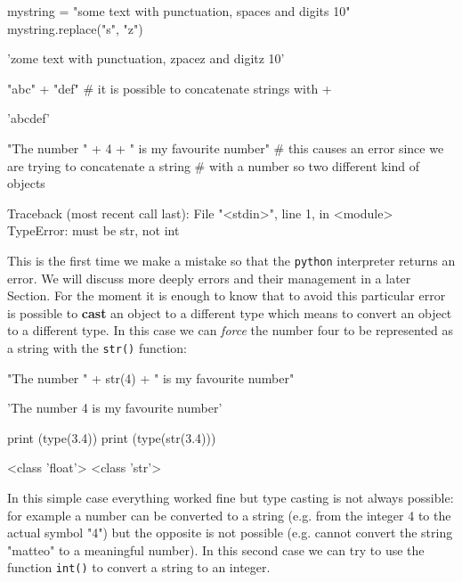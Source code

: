 \begin{ipython}
mystring = "some text with punctuation, spaces and digits 10" 
mystring.replace("s", "z")
\end{ipython}
\begin{ioutput}
'zome text with punctuation, zpacez and digitz 10'
\end{ioutput}

\begin{ipython}
"abc" + "def" # it is possible to concatenate strings with + 
\end{ipython}
\begin{ioutput}
'abcdef'
\end{ioutput}

\begin{ipython}
"The number " + 4 + " is my favourite number"
# this causes an error since we are trying to concatenate a string
# with a number so two different kind of objects
\end{ipython}
\begin{ioutput} 
Traceback (most recent call last):
  File "<stdin>", line 1, in <module>
TypeError: must be str, not int
\end{ioutput}

This is the first time we make a mistake so that the \texttt{python} interpreter returns an error. We will discuss more deeply errors and their management in a later Section. 
For the moment it is enough to know that to avoid this particular error is possible to \textbf{cast} an object to a different type which means to convert an object to a different type. In this case we can \emph{force} the number four to be represented as a string with the \texttt{str()} function:

\begin{ipython}
"The number " + str(4) + " is my favourite number"
\end{ipython}
\begin{ioutput}
'The number 4 is my favourite number'
\end{ioutput}

\begin{ipython}
print (type(3.4)) 
print (type(str(3.4)))
\end{ipython}
\begin{ioutput}
<class 'float'>
<class 'str'>	
\end{ioutput}

In this simple case everything worked fine but type casting is not always possible: for example a number can be converted to a string (e.g. from the integer 4 to the actual symbol "4") but the opposite is not possible (e.g. cannot convert the string "matteo" to a meaningful number). In this second case we can try to use the function \texttt{int()} to convert a string to an integer.

